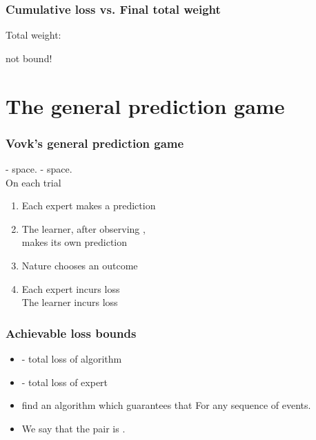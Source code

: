 \documentclass{beamer}
\begin{document}
\begin{frame}
\frametitle{Cumulative loss vs. Final total weight}

 Total weight: 

 
 
\R{\[
\onslide<8-> -\log W^{T+1} =
\onslide<6-> -\log \frac{W^{T+1}}{W^1} = -\sum_{t=1}^T \log p_A^t(c^t)
\onslide<7-> = L_A^T
\]}
  not bound!
\end{frame}

\section{The general prediction game}

\begin{frame}
\frametitle{Vovk's general prediction game}
\R{$\Gamma$} -  space.
\R{$\Omega$} -  space. \\
\pause
On each trial 
\pause
\begin{enumerate}
\item
Each expert  makes a prediction 
\item
The learner, after observing , \\
makes its own prediction 
\item
Nature chooses an outcome 
\item
Each expert incurs loss  \\
The learner incurs loss 
\end{enumerate}
\end{frame}

\begin{frame}
\frametitle{Achievable loss bounds}
\begin{itemize}
\item {} - total loss of algorithm
\item {} - total loss of expert 
\item {} find an algorithm which guarantees that 
\R{\[
(a,c) \in [0,\infty),\;\; \TAloss \leq a \BEloss + c \ln N 
\]}
For any sequence of events.
\item We say that the pair  is .
\end{itemize}
\end{frame}
\end{document}
